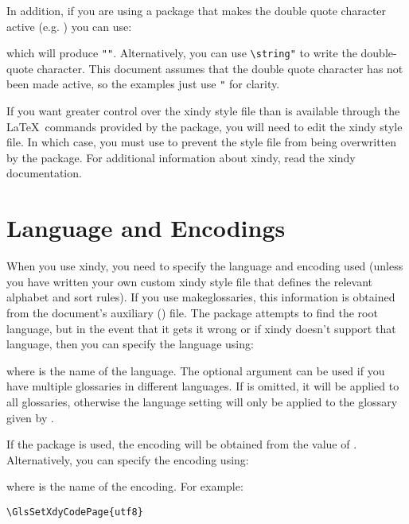\documentclass[report]{nlctdoc}
\begin{document}
In addition, if you are using a package that makes the double
quote character active (e.g. ) you can use:
\begin{definition}[\DescribeMacro{\glsquote}]
\end{definition}
which will produce \verb|"|\verb|"|. Alternatively,
you can use \verb|\string"| to write the double-quote character. 
This document assumes that the double quote character has not been
made active, so the examples just use \verb|"| for clarity.

If you want greater control over the \gls{xindy} style file than is
available through the \LaTeX\ commands provided by the
 package, you will need to edit the \gls*{xindy}
style file. In which case, you must use  to prevent the
style file from being overwritten by the 
package. For additional information about \gls*{xindy}, read the
\gls*{xindy} documentation.

\section{Language and Encodings}
\label{sec:langenc}

When you use \gls{xindy}, you need to specify the language
and encoding used (unless you have written your own custom
\gls*{xindy} style file that defines the relevant alphabet
and sort rules). If you use \gls{makeglossaries},
this information is obtained from the document's auxiliary 
() file.  The  package attempts to 
find the root language, but in the event that it gets it wrong or if 
\gls*{xindy} doesn't support that language, then you can
specify the language using:
\begin{definition}[\DescribeMacro{\GlsSetXdyLanguage}]
\end{definition}
where  is the name of the language. The
optional argument can be used if you have multiple glossaries
in different languages. If  is omitted, it
will be applied to all glossaries, otherwise the language
setting will only be applied to the glossary given by
.

If the  package is used, the encoding will be
obtained from the value of . 
Alternatively, you can specify the encoding using:
\begin{definition}[\DescribeMacro{\GlsSetXdyCodePage}]
\end{definition}
where  is the name of the encoding. For example:
\begin{verbatim}
\GlsSetXdyCodePage{utf8}
\end{verbatim}
\end{document}
